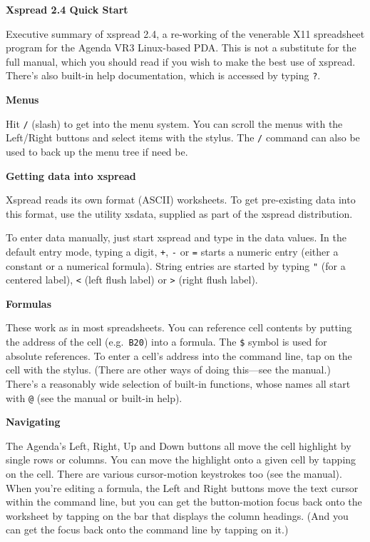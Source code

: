 \documentclass{article}
\newcommand{\myhead}[1]{\vspace{6pt}\noindent\textbf{#1}}
\begin{document}
\begin{center}
 \textbf{Xspread 2.4 Quick Start} 
\end{center}

Executive summary of \textsf{xspread 2.4}, a re-working of the
venerable X11 spreadsheet program for the Agenda VR3 Linux-based PDA.
This is not a substitute for the full manual, which you should read if
you wish to make the best use of \textsf{xspread}.  There's also
built-in help documentation, which is accessed by typing \texttt{?}.

\myhead{Menus}

Hit \texttt{/} (slash) to get into the menu system.  You can scroll
the menus with the Left/Right buttons and select items with the
stylus.  The \texttt{/} command can also be used to back up the menu
tree if need be.

\myhead{Getting data into xspread}

\textsf{Xspread} reads its own format (ASCII) worksheets.  To get
pre-existing data into this format, use the utility \textsf{xsdata},
supplied as part of the \textsf{xspread} distribution.

To enter data manually, just start \textsf{xspread} and type in the
data values.  In the default entry mode, typing a digit, \texttt{+},
\texttt{-} or \texttt{=} starts a numeric entry (either a constant or
a numerical formula).  String entries are started by typing
\texttt{"} (for a centered label), \texttt{<} (left flush label) or
\texttt{>} (right flush label).

\myhead{Formulas}

These work as in most spreadsheets.  You can reference cell contents
by putting the address of the cell (e.g.\ \texttt{B20}) into a
formula.  The \texttt{\$} symbol is used for absolute references.  To
enter a cell's address into the command line, tap on the cell with the
stylus.  (There are other ways of doing this---see the manual.)
There's a reasonably wide selection of built-in functions, whose names
all start with \texttt{@} (see the manual or built-in help).

\myhead{Navigating}

The Agenda's Left, Right, Up and Down buttons all move the cell
highlight by single rows or columns.  You can move the highlight onto
a given cell by tapping on the cell.  There are various cursor-motion
keystrokes too (see the manual).  When you're editing a formula, the
Left and Right buttons move the text cursor within the command line,
but you can get the button-motion focus back onto the worksheet by
tapping on the bar that displays the column headings. (And you can get
the focus back onto the command line by tapping on it.)
\end{document}
